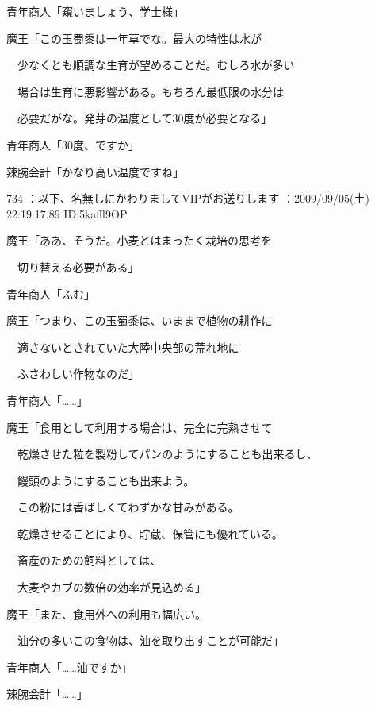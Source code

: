 \documentclass[a4j,twocolumn]{tarticle}
\begin{document}
青年商人「窺いましょう、学士様」 



魔王「この玉蜀黍は一年草でな。最大の特性は水が\par{} 
　少なくとも順調な生育が望めることだ。むしろ水が多い\par{} 
　場合は生育に悪影響がある。もちろん最低限の水分は\par{} 
　必要だがな。発芽の温度として30度が必要となる」 



青年商人「30度、ですか」\par{} 
辣腕会計「かなり高い温度ですね」 

	
    
    

734 ：以下、名無しにかわりましてVIPがお送りします ：2009/09/05(土) 22:19:17.89 ID:5kaffl9OP 


魔王「ああ、そうだ。小麦とはまったく栽培の思考を\par{} 
　切り替える必要がある」\par{} 
青年商人「ふむ」 



魔王「つまり、この玉蜀黍は、いままで植物の耕作に\par{} 
　適さないとされていた大陸中央部の荒れ地に\par{} 
　ふさわしい作物なのだ」 



青年商人「……」 



魔王「食用として利用する場合は、完全に完熟させて\par{} 
　乾燥させた粒を製粉してパンのようにすることも出来るし、\par{} 
　饅頭のようにすることも出来よう。\par{} 
　この粉には香ばしくてわずかな甘みがある。\par{} 
　乾燥させることにより、貯蔵、保管にも優れている。\par{} 
　畜産のための飼料としては、\par{} 
　大麦やカブの数倍の効率が見込める」 



魔王「また、食用外への利用も幅広い。\par{} 
　油分の多いこの食物は、油を取り出すことが可能だ」 



青年商人「……油ですか」\par{} 
辣腕会計「……」 
\end{document}
